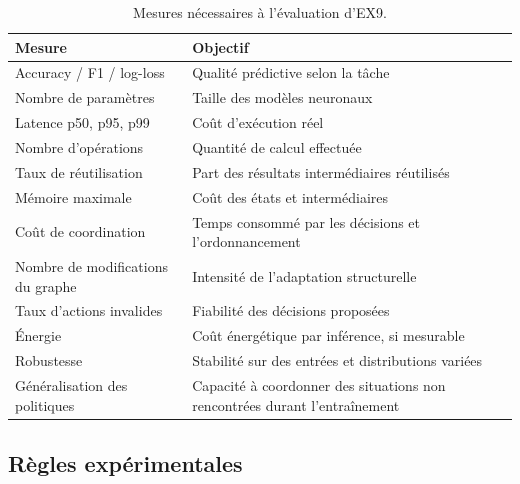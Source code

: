 \documentclass[11pt,a4paper]{article}
\begin{document}
\begin{table}[H]
\centering
\small
\begin{tabularx}{\textwidth}{p{3.2cm}X}
\toprule
Mesure & Objectif \\
\midrule
Accuracy / F1 / log-loss
& Qualité prédictive selon la tâche \\

Nombre de paramètres
& Taille des modèles neuronaux \\

Latence p50, p95, p99
& Coût d'exécution réel \\

Nombre d'opérations
& Quantité de calcul effectuée \\

Taux de réutilisation
& Part des résultats intermédiaires réutilisés \\

Mémoire maximale
& Coût des états et intermédiaires \\

Coût de coordination
& Temps consommé par les décisions et l'ordonnancement \\

Nombre de modifications du graphe
& Intensité de l'adaptation structurelle \\

Taux d'actions invalides
& Fiabilité des décisions proposées \\

Énergie
& Coût énergétique par inférence, si mesurable \\

Robustesse
& Stabilité sur des entrées et distributions variées \\

Généralisation des politiques
& Capacité à coordonner des situations non rencontrées
durant l'entraînement \\
\bottomrule
\end{tabularx}
\caption{Mesures nécessaires à l'évaluation d'EX9.}
\end{table}

\subsection{Règles expérimentales}
\end{document}
